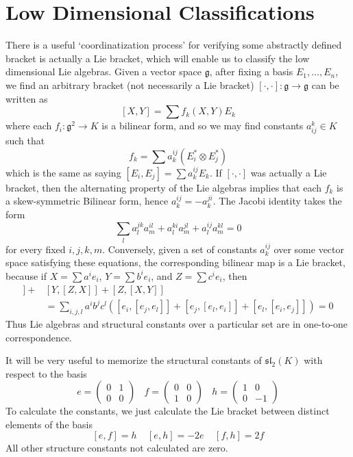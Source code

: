 \section{Low Dimensional Classifications}

There is a useful `coordinatization process' for verifying some abstractly defined bracket is actually a Lie bracket, which will enable us to classify the low dimensional Lie algebras. Given a vector space $\mathfrak{g}$, after fixing a basis $E_1, \dots, E_n$, we find an arbitrary bracket (not necessarily a Lie bracket) $[\cdot, \cdot]: \mathfrak{g} \to \mathfrak{g}$ can be written as
%
\[ [X,Y] = \sum f_k(X,Y) E_k \]
%
where each $f_i: \mathfrak{g}^2 \to K$ is a bilinear form, and so we may find constants $a_{ij}^k \in K$ such that
%
\[ f_k = \sum a_k^{ij} ( E_i^* \otimes E_j^* ) \]
%
which is the same as saying $[E_i, E_j] = \sum a^{ij}_k E_k$. If $[\cdot, \cdot]$ was actually a Lie bracket, then the alternating property of the Lie algebras implies that each $f_k$ is a skew-symmetric Bilinear form, hence $a_k^{ij} = -a^{ji}_k$. The Jacobi identity takes the form
%
\[ \sum_l a^{jk}_l a^{il}_m + a^{ki}_l a^{jl}_m + a^{ij}_l a^{kl}_m = 0 \]
%
for every fixed $i,j,k,m$. Conversely, given a set of constants $a_k^{ij}$ over some vector space satisfying these equations, the corresponding bilinear map is a Lie bracket, because if $X = \sum a^i e_i$, $Y = \sum b^i e_i$, and $Z = \sum c^i e_i$, then
%
\begin{align*}
    [X,[Y,Z]] + &[Y,[Z,X]] + [Z,[X,Y]]\\
    &= \sum_{i,j,l} a^i b^j c^l \left( [e_i,[e_j,e_l]] + [e_j,[e_l,e_i]] + [e_l,[e_i,e_j]] \right) = 0
\end{align*}
%
Thus Lie algebras and structural constants over a particular set are in one-to-one correspondence.

\begin{example}
    It will be very useful to memorize the structural constants of $\mathfrak{sl}_2(K)$ with respect to the basis
    \[ e = \begin{pmatrix} 0 & 1 \\ 0 & 0 \end{pmatrix}\ \ \ \ f = \begin{pmatrix} 0 & 0 \\ 1 & 0 \end{pmatrix}\ \ \ \ h = \begin{pmatrix} 1 & 0 \\ 0 & -1 \end{pmatrix} \]
    To calculate the constants, we just calculate the Lie bracket between distinct elements of the basis
    \[ [e,f] = h\ \ \ \ \ [e,h] = -2e\ \ \ \ \ [f,h] = 2f \]
    All other structure constants not calculated are zero.
\end{example}

